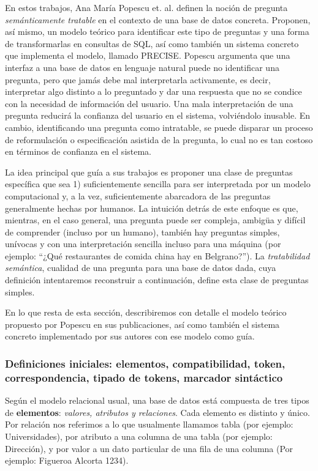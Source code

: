 En estos trabajos, Ana María Popescu et. al. definen la noción de pregunta \textit{semánticamente tratable} en el contexto de una base de datos concreta. Proponen, así mismo, un modelo teórico para identificar este tipo de preguntas y una forma de transformarlas en consultas de SQL, así como también un sistema concreto que implementa el modelo, llamado PRECISE. Popescu argumenta que una interfaz a una base de datos en lenguaje natural puede no identificar una pregunta, pero que jamás debe mal interpretarla activamente, es decir, interpretar algo distinto a lo preguntado y dar una respuesta que no se condice con la necesidad de información del usuario. Una mala interpretación de una pregunta reducirá la confianza del usuario en el sistema, volviéndolo inusable. En cambio, identificando una pregunta como intratable, se puede disparar un proceso de reformulación o especificación asistida de la pregunta, lo cual no es tan costoso en términos de confianza en el sistema.

La idea principal que guía a sus trabajos es proponer una clase de preguntas específica que sea 1) suficientemente sencilla para ser interpretada por un modelo computacional y, a la vez, suficientemente abarcadora de las preguntas generalmente hechas por humanos. La intuición detrás de este enfoque es que, mientras, en el caso general, una pregunta puede ser compleja, ambigüa y difícil de comprender (incluso por un humano), también hay preguntas simples, unívocas y con una interpretación sencilla incluso para una máquina (por ejemplo: ``¿Qué restaurantes de comida china hay en Belgrano?''). La \textit{tratabilidad semántica}, cualidad de una pregunta para una base de datos dada, cuya definición intentaremos reconstruir a continuación, define esta clase de preguntas simples.

En lo que resta de esta sección, describiremos con detalle el modelo teórico propuesto por Popescu en sus publicaciones, así como también el sistema concreto implementado por sus autores con ese modelo como guía.

\subsubsection*{Definiciones iniciales: elementos, compatibilidad, token, correspondencia, tipado de tokens, marcador sintáctico}

Según el modelo relacional usual, una base de datos está compuesta de tres tipos de \textbf{elementos}: \textit{valores, atributos y relaciones}. Cada elemento es distinto y único. Por relación nos referimos a lo que usualmente llamamos tabla (por ejemplo: Universidades), por atributo a una columna de una tabla (por ejemplo: Dirección), y por valor a un dato particular de una fila de una columna (Por ejemplo: Figueroa Alcorta 1234).

